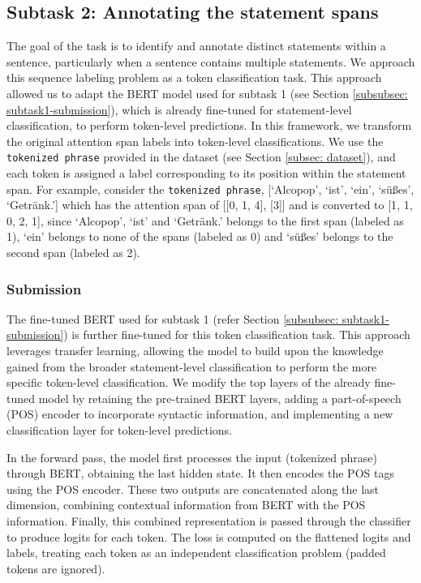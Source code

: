 \documentclass[11pt]{article}
\begin{document}
\subsection{Subtask 2: Annotating the statement spans}\label{subsec: subtask2}

The goal of the task is to identify and annotate distinct statements within a sentence, particularly when a sentence contains multiple statements. We approach this sequence labeling problem as a token classification task. This approach allowed us to adapt the BERT model used for subtask 1 (see Section \ref{subsubsec: subtask1-submission}), which is already fine-tuned for statement-level classification, to perform token-level predictions. In this framework, we transform the original attention span labels into token-level classifications. We use the \texttt{tokenized phrase} provided in the dataset (see Section \ref{subsec: dataset}), and each token is assigned a label corresponding to its position within the statement span. For example, consider the \texttt{tokenized phrase}, [`Alcopop', `ist', `ein', `süßes', `Getränk.'] which has the attention span of [[0, 1, 4], [3]] and is converted to [1, 1, 0, 2, 1], since `Alcopop', `ist' and `Getränk.' belongs to the first span (labeled as 1), `ein' belongs to none of the spans (labeled as 0) and `süßes' belongs to the second span (labeled as 2).

\subsubsection{Submission}\label{subsubsec: subtask2-submission}

The fine-tuned BERT used for subtask 1 (refer Section \ref{subsubsec: subtask1-submission}) is further fine-tuned for this token classification task. This approach leverages transfer learning, allowing the model to build upon the knowledge gained from the broader statement-level classification to perform the more specific token-level classification. We modify the top layers of the already fine-tuned model by retaining the pre-trained BERT layers, adding a part-of-speech (POS) encoder to incorporate syntactic information, and implementing a new classification layer for token-level predictions. 

In the forward pass, the model first processes the input (tokenized phrase) through BERT, obtaining the last hidden state. It then encodes the POS tags using the POS encoder. These two outputs are concatenated along the last dimension, combining contextual information from BERT with the POS information. Finally, this combined representation is passed through the classifier to produce logits for each token. The loss is computed on the flattened logits and labels, treating each token as an independent classification problem (padded tokens are ignored).
\end{document}
